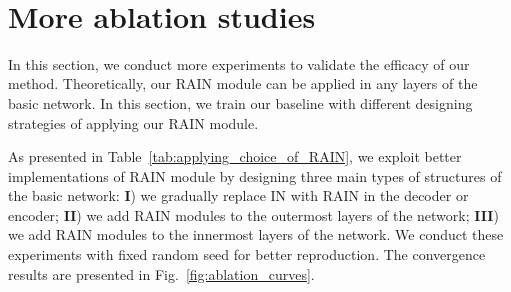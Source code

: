 \documentclass[final]{cvpr}
\begin{document}
\begin{figure*}
\begin{center}
\hspace{0.4cm}
\vspace{0cm}\\\hspace{0.2cm}
\hspace{0.25cm}
\end{center}
\caption{
  Convergence curves on PSNR metric. (a) Type I. We only add RAIN layers to the decoder or encoder. (b) Type II: we add RAIN modules to the outermost layers of the network; (c) Type III: we add RAIN modules to the innermost layers of the network. (d) Convergence curves of DIH~\cite{tsai2017deep} and DIH+RAIN on PSNR metric. Better viewed in color with zoom in.}
\label{fig:ablation_curves}
\end{figure*}

\section{More ablation studies}
\label{sec:more_ablation}
In this section, we conduct more experiments to validate the efficacy of our method. Theoretically, our RAIN module can be applied in any layers of the basic network. In this section, we train our baseline with different designing strategies of applying our RAIN module. 

As presented in Table~\ref{tab:applying_choice_of_RAIN}, we exploit better implementations of RAIN module by designing three main types of structures of the basic network: 
\textbf{I}) we gradually replace IN with RAIN in the decoder or encoder; \textbf{II}) we add RAIN modules to the outermost layers of the network; \textbf{III}) we add RAIN modules to the innermost layers of the network. We conduct these experiments with fixed random seed for better reproduction. The convergence results are presented in Fig.~\ref{fig:ablation_curves}. 
\end{document}
